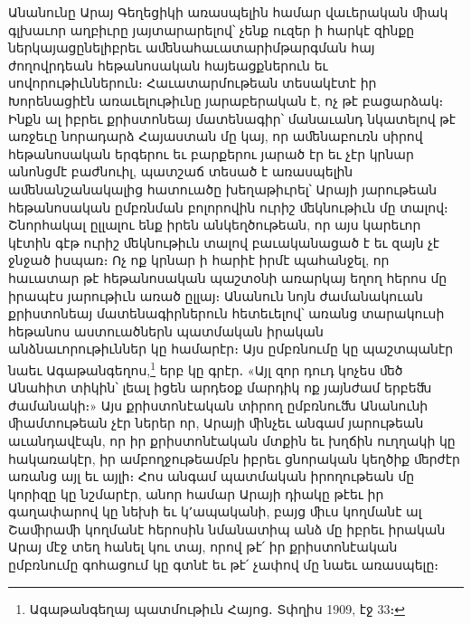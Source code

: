 \documentclass{article}
\begin{document}
{Անանունը Արայ Գեղեցիկի առասպելին համար վաւերական ﬕակ գլխաւոր աղբիւրը յայտարարելով՝ չենք ուզեր ի հարկէ զինքը ներկայացընելիբրեւ աﬔնահաւատարիմթարգման հայ ժողովրդեան հեթանոսական հայեացքներուն եւ սովորութիւններուն։ Հաւատարմութեան տեսակէտէ իր Խորենացիէն առաւելութիւնը յարաբերական է, ոչ թէ բացարձակ։ Ինքն ալ իբրեւ քրիստոնեայ մատենագիր՝ մանաւանդ նկատելով թէ առջեւը նորադարձ Հայաստան մը կայ, որ աﬔնաբուռն սիրով հեթանոսական երգերու եւ բարքերու յարած էր եւ չէր կրնար անոնցմէ բաժնուիլ, պատշաճ տեսած է առասպելին աﬔնանշանակալից հատուածը խեղաթիւրել՝ Արայի յարութեան հեթանոսական ըմբռնման բոլորովին ուրիշ ﬔկնութիւն մը տալով։ Շնորհակալ ըլլալու ենք իրեն անկեղծութեան, որ այս կարեւոր կէտին գէթ ուրիշ ﬔկնութիւն տալով բաւականացած է եւ զայն չէ ջնջած իսպառ։ Ոչ ոք կրնար ի հարիէ իրմէ պահանջել, որ հաւատար թէ հեթանոսական պաշտօնի առարկայ եղող հերոս մը իրապէս յարութիւն առած ըլլայ։ Անանուն նոյն ժամանակուան քրիստոնեայ մատենագիրներուն հետեւելով՝ առանց տարակուսի հեթանոս աստուածներն պատմական իրական անձնաւորութիւններ կը համարէր։ Այս ըմբռնումը կը պաշտպանէր նաեւ Ագաթանգեղոս,\footnote{Ագաթանգեղայ պատմութիւն Հայոց․ Տփղիս 1909, էջ 33։} երբ կը գրէր․ «Այլ զոր դուդ կոչես ﬔծ Անահիտ տիկին՝ լեալ իցեն արդեօք մարդիկ ոք յայնժամ երբեﬓ ժամանակի։» Այս քրիստոնէական տիրող ըմբռնուﬓ Անանունի ﬕամտութեան չէր ներեր որ, Արայի ﬕնչեւ անգամ յարութեան աւանդավէպն, որ իր քրիստոնէական մտքին եւ խղճին ուղղակի կը հակառակէր, իր ամբողջութեամբն իբրեւ ցնորական կեղծիք ﬔրժէր առանց այլ եւ այլի։ Հոս անգամ պատմական իրողութեան մը կորիզը կը նշմարէր, անոր համար Արայի դիակը թէեւ իր գաղափարով կը նեխի եւ կ՚ապականի, բայց ﬕւս կողմանէ ալ Շաﬕրաﬕ կողմանէ հերոսին նմանատիպ անձ մը իբրեւ իրական Արայ մէջ տեղ հանել կու տայ, որով թէ՛ իր քրիստոնէական ըմբռնումը գոհացում կը գտնէ եւ թէ՛ չափով մը նաեւ առասպելը։

}
\end{document}

